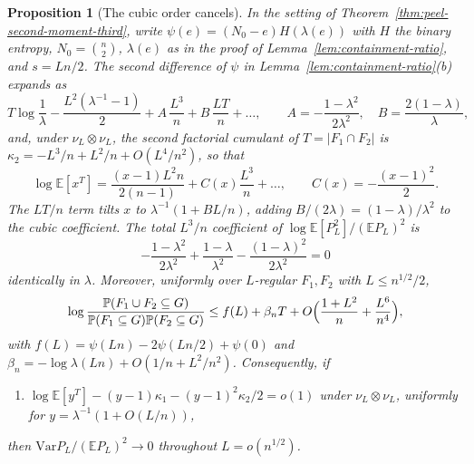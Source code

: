 \documentclass[11pt]{article}
\newtheorem{proposition}[theorem]{Proposition}
\newcommand{\EE}{\mathbb{E}}
\newcommand{\PP}{\mathbb{P}}
\newcommand{\Var}{\mathrm{Var}}
\begin{document}
\begin{proposition}[The cubic order cancels]
\label{prop:peel-cubic-cancels}
In the setting of Theorem~\ref{thm:peel-second-moment-third}, write
\(\psi(e)=(N_0-e)H(\lambda(e))\) with \(H\) the binary entropy, \(N_0=\binom n2\),
\(\lambda(e)\) as in the proof of Lemma~\ref{lem:containment-ratio}, and
\(s=Ln/2\). The second difference of \(\psi\) in
Lemma~\ref{lem:containment-ratio}(b) expands as
\[
T\log\frac1\lambda-\frac{L^2(\lambda^{-1}-1)}2
+A\,\frac{L^3}{n}+B\,\frac{LT}{n}+\dots,
\qquad
A=-\frac{1-\lambda^2}{2\lambda^2},\quad B=\frac{2(1-\lambda)}{\lambda},
\]
and, under \(\nu_L\otimes\nu_L\), the second factorial cumulant of
\(T=|F_1\cap F_2|\) is \(\kappa_2=-L^3/n+L^2/n+O(L^4/n^2)\), so that
\[
\log\EE[x^T]=\frac{(x-1)L^2n}{2(n-1)}+C(x)\frac{L^3}{n}+\dots,
\qquad C(x)=-\frac{(x-1)^2}2 .
\]
The \(LT/n\) term tilts \(x\) to \(\lambda^{-1}(1+BL/n)\), adding
\(B/(2\lambda)=(1-\lambda)/\lambda^2\) to the cubic coefficient. The total
\(L^3/n\) coefficient of \(\log\EE[P_L^2]/(\EE P_L)^2\) is
\[
-\frac{1-\lambda^2}{2\lambda^2}+\frac{1-\lambda}{\lambda^2}-\frac{(1-\lambda)^2}{2\lambda^2}=0
\]
identically in \(\lambda\). Moreover, uniformly over \(L\)-regular \(F_1,F_2\) with
\(L\le n^{1/2}/2\),
\begin{equation}\label{eq:peel-upper}
\log\frac{\PP(F_1\cup F_2\subseteq G)}{\PP(F_1\subseteq G)\PP(F_2\subseteq G)}
\le f(L)+\beta_nT+O\Bigl(\frac{1+L^2}n+\frac{L^6}{n^4}\Bigr),
\end{equation}
with \(f(L)=\psi(Ln)-2\psi(Ln/2)+\psi(0)\) and
\(\beta_n=-\log\lambda(Ln)+O(1/n+L^2/n^2)\). Consequently, if
\begin{enumerate}
\item[(R2\(^*\))] \(\log\EE[y^T]-(y-1)\kappa_1-(y-1)^2\kappa_2/2=o(1)\) under
\(\nu_L\otimes\nu_L\), uniformly for \(y=\lambda^{-1}(1+O(L/n))\),
\end{enumerate}
then \(\Var P_L/(\EE P_L)^2\to0\) throughout \(L=o(n^{1/2})\).
\end{proposition}
\end{document}
